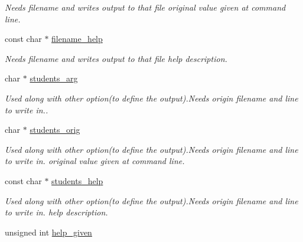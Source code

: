 \begin{DoxyCompactItemize}
\begin{DoxyCompactList}\small\item\em Needs filename and writes output to that file original value given at command line. \end{DoxyCompactList}\item 
\hypertarget{structgengetopt__args__info_a30887bdf15615ff61ec75cdbcf6c26f3}{const char $\ast$ \hyperlink{structgengetopt__args__info_a30887bdf15615ff61ec75cdbcf6c26f3}{filename\-\_\-help}}\label{structgengetopt__args__info_a30887bdf15615ff61ec75cdbcf6c26f3}

\begin{DoxyCompactList}\small\item\em Needs filename and writes output to that file help description. \end{DoxyCompactList}\item 
\hypertarget{structgengetopt__args__info_abf3cea20b506840306dc451ba06bc012}{char $\ast$ \hyperlink{structgengetopt__args__info_abf3cea20b506840306dc451ba06bc012}{students\-\_\-arg}}\label{structgengetopt__args__info_abf3cea20b506840306dc451ba06bc012}

\begin{DoxyCompactList}\small\item\em Used along with other option(to define the output).Needs origin filename and line to write in.. \end{DoxyCompactList}\item 
\hypertarget{structgengetopt__args__info_a9e12f836ded2602d7cf23c3b962fedfa}{char $\ast$ \hyperlink{structgengetopt__args__info_a9e12f836ded2602d7cf23c3b962fedfa}{students\-\_\-orig}}\label{structgengetopt__args__info_a9e12f836ded2602d7cf23c3b962fedfa}

\begin{DoxyCompactList}\small\item\em Used along with other option(to define the output).Needs origin filename and line to write in. original value given at command line. \end{DoxyCompactList}\item 
\hypertarget{structgengetopt__args__info_a1c0f87e9a0d2f4bc101662e56b19afca}{const char $\ast$ \hyperlink{structgengetopt__args__info_a1c0f87e9a0d2f4bc101662e56b19afca}{students\-\_\-help}}\label{structgengetopt__args__info_a1c0f87e9a0d2f4bc101662e56b19afca}

\begin{DoxyCompactList}\small\item\em Used along with other option(to define the output).Needs origin filename and line to write in. help description. \end{DoxyCompactList}\item 
\hypertarget{structgengetopt__args__info_ab9fd677f890731fd7d6f6c62e6dfc99c}{unsigned int \hyperlink{structgengetopt__args__info_ab9fd677f890731fd7d6f6c62e6dfc99c}{help\-\_\-given}}\label{structgengetopt__args__info_ab9fd677f890731fd7d6f6c62e6dfc99c}


\end{DoxyCompactItemize}
